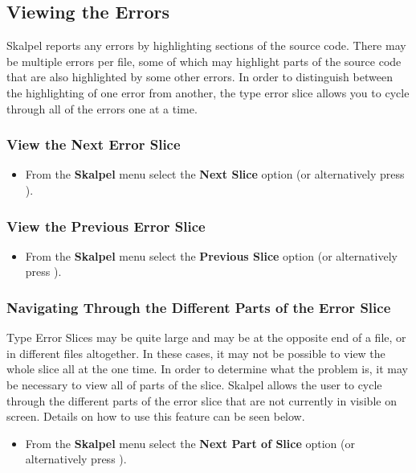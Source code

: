 \documentclass{report}
\begin{document}

\subsection{Viewing the Errors}

Skalpel reports any errors by highlighting sections of
the source code. There may be multiple errors per file, some of which
may highlight parts of the source code that are also highlighted by
some other errors. In order to distinguish between the highlighting
of one error from another, the type error slice allows you to cycle
through all of the errors one at a time.

\subsubsection{View the Next Error Slice}

\begin{itemize}
\item From the \textbf{Skalpel} menu select the \textbf{Next Slice}
  option (or alternatively press ).
\end{itemize}

\subsubsection{View the Previous Error Slice}

\begin{itemize}
\item From the \textbf{Skalpel} menu select the \textbf{Previous Slice}
  option (or alternatively press ).
\end{itemize}

\subsubsection{Navigating Through the Different Parts of the Error Slice}
Type Error Slices may be quite large and may be at the opposite end of
a file, or in different files altogether. In these cases, it may not
be possible to view the whole slice all at the one time. In order to
determine what the problem is, it may be necessary to view all of
parts of the slice. Skalpel allows the user to cycle
through the different parts of the error slice that are not currently
in visible on screen. Details on how to use this feature can be seen below.

\begin{itemize}
\item From the \textbf{Skalpel} menu select the \textbf{Next Part of
  Slice} option (or alternatively press ).
\end{itemize}
\end{document}

